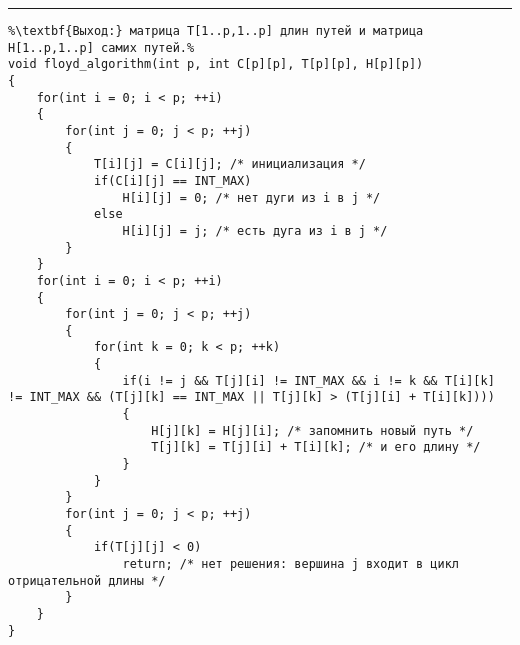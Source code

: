 \documentclass{article}
\begin{document}
\vspace{5pt} \hrule
\begin{lstlisting}[caption={Алгоритм Флойда}, label=p285, escapechar=\%]
%\noindent\textbf{Вход:} матрица C[1..p,1..p] длин дуг.\\%
%\textbf{Выход:} матрица T[1..p,1..p] длин путей и матрица H[1..p,1..p] самих путей.%
void floyd_algorithm(int p, int C[p][p], T[p][p], H[p][p])
{
	for(int i = 0; i < p; ++i)
	{
		for(int j = 0; j < p; ++j)
		{
			T[i][j] = C[i][j]; /* инициализация */
			if(C[i][j] == INT_MAX)
				H[i][j] = 0; /* нет дуги из i в j */
			else
				H[i][j] = j; /* есть дуга из i в j */
		}
	}
	for(int i = 0; i < p; ++i)
	{
		for(int j = 0; j < p; ++j)
		{
			for(int k = 0; k < p; ++k)
			{
				if(i != j && T[j][i] != INT_MAX && i != k && T[i][k] != INT_MAX && (T[j][k] == INT_MAX || T[j][k] > (T[j][i] + T[i][k])))
				{
					H[j][k] = H[j][i]; /* запомнить новый путь */
					T[j][k] = T[j][i] + T[i][k]; /* и его длину */
				}
			}
		}
		for(int j = 0; j < p; ++j)
		{
			if(T[j][j] < 0)
				return; /* нет решения: вершина j входит в цикл отрицательной длины */
		}
	}
}
\end{lstlisting}
\end{document}
